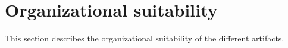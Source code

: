 \section{Organizational suitability}
This section describes the organizational suitability of the different artifacts.
